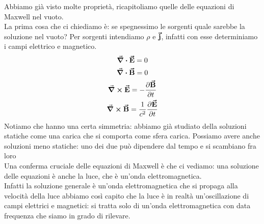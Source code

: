 Abbiamo già visto molte proprietà, ricapitoliamo quelle delle equazioni di Maxwell nel vuoto.\\
La prima cosa che ci chiediamo è: se spegnessimo le sorgenti quale sarebbe la soluzione nel vuoto? Per sorgenti intendiamo $\rho$ e $\vb*{\va{j}}$, infatti con esse determiniamo i campi elettrico e magnetico.
\begin{gather*}
	\div\vb*{\va{E}}=0\\
	\div\vb*{\va{B}}=0\\
	\curl\vb*{\va{E}}=-\pdv{\vb*{\va{B}}}{t}\\
	\curl\vb*{\va{B}}= \frac{1}{c^2}\pdv{\vb*{\va{E}}}{t}
\end{gather*}
Notiamo che hanno una certa simmetria: abbiamo già studiato della soluzioni statiche come una carica che si comporta come sfera carica. Possiamo avere anche soluzioni meno statiche: uno dei due può dipendere dal tempo e si scambiano fra loro\\
Una conferma cruciale delle equazioni di Maxwell è che ci vediamo: una soluzione delle equazioni è anche la luce, che è un'onda elettromagnetica.\\
Infatti la soluzione generale è un'onda elettromagnetica che si propaga alla velocità della luce
abbiamo così capito che la luce è in realtà un'oscillazione di campi elettrici e magnetici: si tratta solo di un'onda elettromagnetica con data frequenza che siamo in grado di rilevare.


